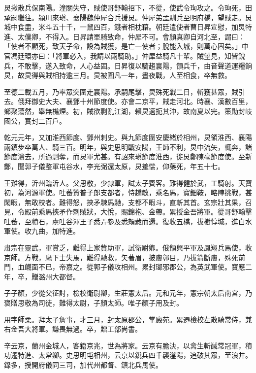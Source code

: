 \begin{pinyinscope}
 炅揪散兵保南陽。潼關失守，賊使哥舒翰招下，不從，使武令珣攻之。令珣死，田承嗣繼往。潁川來瑱、襄陽魏仲犀合兵援炅。仲犀弟孟馴兵至明府橋，望賊走。炅城中食盡，米斗五十千，一鼠四百，餓者相枕藉。朝廷遣使者曹日昇宣慰，加炅特進、太僕卿，不得入。日昇請單騎致命，仲犀不可。會顏真卿自河北至，謂曰：「使者不顧死，致天子命，設為賊獲，是亡一使者；脫能入城，則萬心固矣。」中官馮廷環亦曰：「將軍必入，我請以兩騎助。」仲犀益騎凡十輩。賊望見，知皆銳兵，不敢擊，遂入致命，人心益固。日昇復以騎趨襄陽，領兵千，由音聲道運糧餉炅，故炅得與賊相持逾三月。炅被圍凡一年，晝夜戰，人至相食，卒無救。



 至德二載五月，乃率眾突圍走襄陽。承嗣尾擊，炅殊死戰二日，斬獲甚眾，賊引去。俄拜御史大夫、襄鄧十州節度使。亦會二京平，賊走河北。時襄、漢數百里，鄉聚蕩然，舉無樵煙。初，賊欲剽亂江湖，賴炅適扼其沖，故南夏以完。策勛封岐國公，實封二百戶。



 乾元元年，又加淮西節度、鄧州刺史。與九節度圍安慶緒於相州，炅領淮西、襄陽兩鎮步卒萬人、騎三百。明年，與史思明戰安陽，王師不利，炅中流矢，輒奔，諸節度潰去，所過剽奪，而炅軍尤甚。有詔來瑱節度淮西，徙炅鄭陳亳節度使。至新鄭，聞郭子儀整軍屯谷水，李光弼還太原，炅羞惴，仰藥死，年五十七。



 王難得，沂州臨沂人。父思敬，少隸軍，試太子賓客。難得健於武，工騎射。天寶初，為河源軍使。吐蕃贊普子郎支都者，恃趫敏，乘名馬，寶鈿鞍，略陣挑戰，甚閑暇，無敢校者。難得怒，挾矛駷馬馳，支都不暇斗，直斬其首。玄宗壯其果，召見，令殿前乘馬挾矛作刺賊狀，大悅，賜錦袍、金帶。累授金吾將軍。從哥舒翰擊吐蕃，至積石，虜吐谷渾王子悉弄參及悉頰藏而還。復收五橋，拔樹惇城，進白水軍使。收九曲，加特進。



 肅宗在靈武，軍賞乏，難得上家貲助軍，試衛尉卿。俄領興平軍及鳳翔兵馬使，收京師。方戰，麾下士失馬，難得馳救，矢著眉，披膚鄣目，乃拔箭斷膚，殊死前鬥，血衊面不已，帝嘉之。從郭子儀攻相州。累封瑯邪郡公，為英武軍使。寶應二年，卒，贈潞州大都督。



 子子顏，少從父征討，檢校衛尉卿，生莊憲太后。元和元年，憲宗朝太后南宮，乃褒贈思敬為司徒，難得太尉，子顏太師。唯子顏子用及封。



 用字師柔。拜太子詹事，才三月，封太原郡公，掌廄苑。累遷檢校左散騎常侍，兼右金吾大將軍。謙畏無過。卒，贈工部尚書。



 辛云京，蘭州金城人，客籍京兆，世為將家。云京有膽決，以禽生斬馘常冠軍，積功遷特進、太常卿。史思明屯相州，云京以銳兵四千襲滏陽，追破其眾，至浪井。錄多，授開府儀同三司，加代州都督、鎮北兵馬使。




\end{pinyinscope}
